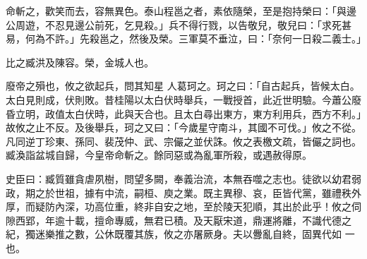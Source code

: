 \begin{pinyinscope}
 命斬之，歡笑而去，容無異色。泰山程邕之者，素依隨榮，至是抱持榮曰：「與邊公周遊，不忍見邊公前死，乞見殺。」兵不得行戮，以告敬兒，敬兒曰：「求死甚易，何為不許。」先殺邕之，然後及榮。三軍莫不垂泣，曰：「奈何一日殺二義士。」



 比之臧洪及陳容。榮，金城人也。



 廢帝之殞也，攸之欲起兵，問其知星
 人葛珂之。珂之曰：「自古起兵，皆候太白。太白見則成，伏則敗。昔桂陽以太白伏時舉兵，一戰授首，此近世明驗。今蕭公廢昏立明，政值太白伏時，此與天合也。且太白尋出東方，東方利用兵，西方不利。」故攸之止不反。及後舉兵，珂之又曰：「今歲星守南斗，其國不可伐。」攸之不從。凡同逆丁珍東、孫同、裴茂仲、武、宗儼之並伏誅。攸之表檄文疏，皆儼之詞也。臧渙詣盆城自歸，今皇帝命斬之。餘同惡或為亂軍所殺，或遇赦得原。



 史臣曰：臧質雖貪虐夙樹，問望多闕，奉義治流，本無吞噬之志也。徒欲以幼君弱政，期之於世祖，據有中流，嗣桓、庾之業。既主異穆、哀，臣皆代黨，雖禮秩外厚，而疑防內深，功高位重，終非自安之地，至於陵天犯順，其出於此乎！攸之伺隙西郢，年逾十載，擅命專威，無君已積。及天厭宋道，鼎運將離，不識代德之紀，獨迷樂推之數，公休既覆其族，攸之亦屠厥身。夫以釁亂自終，固異代如
 一也。



\end{pinyinscope}